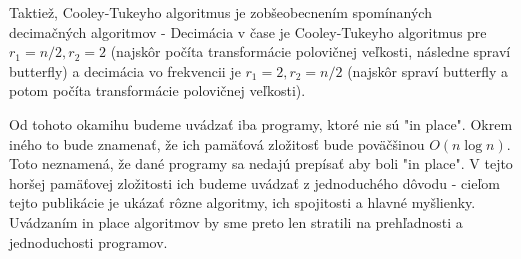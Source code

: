 Taktiež, Cooley-Tukeyho algoritmus je zobšeobecnením spomínaných
decimačných algoritmov - Decimácia v čase je Cooley-Tukeyho algoritmus
pre $r_1 =n/2, r_2=2$ (najskôr počíta transformácie polovičnej
veľkosti, následne spraví butterfly) a decimácia vo frekvencii je
$r_1=2, r_2=n/2$ (najskôr spraví butterfly a potom počíta
transformácie polovičnej veľkosti).

\begin{poznamka}
    Od tohoto okamihu budeme uvádzať iba programy, ktoré nie sú 
    "in place". Okrem iného to bude znamenať, že ich pamäťová
    zložitosť bude poväčšinou $O(n \log n)$. Toto neznamená, že dané
    programy sa nedajú prepísať aby boli "in place". V tejto horšej
    pamäťovej zložitosti ich budeme uvádzať z jednoduchého dôvodu -
    cieľom tejto publikácie je ukázať rôzne algoritmy, ich spojitosti
    a hlavné myšlienky. Uvádzaním in place algoritmov by sme preto len
    stratili na prehľadnosti a jednoduchosti programov.
\end{poznamka}


